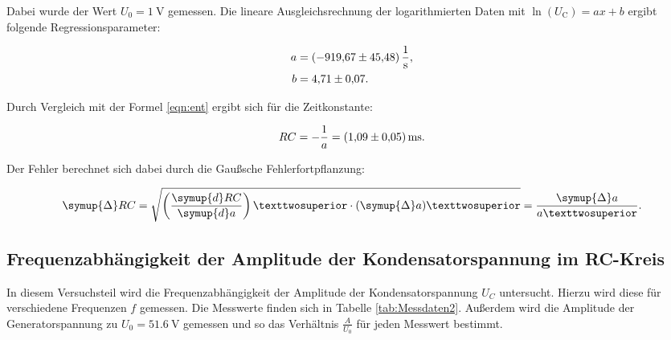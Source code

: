 Dabei wurde der Wert $U_0 = \SI{1}{\volt}$ gemessen.
Die lineare Ausgleichsrechnung der logarithmierten Daten mit $\ln{\left(U_\text{C}\right)}=ax+b$ 
ergibt folgende Regressionsparameter: 

\begin{align*}
a &= \SI{-919.67+-45.48}{\per\second},\\
b &= \num{4.71+-0.07}.
\end{align*}

Durch Vergleich mit der Formel \eqref{eqn:ent} ergibt sich für die Zeitkonstante:

\begin{equation*}
RC = -\frac{1}{a} = \SI{1.09+-0.05}{\milli\second}.
\end{equation*}

Der Fehler berechnet sich dabei durch die Gaußsche Fehlerfortpflanzung:

\begin{equation*}
\symup{\Delta} RC = \sqrt{\left(\frac{\symup{d}RC}{\symup{d}a}\right)²\cdot (\symup{\Delta}a)²} = \frac{\symup{\Delta}a}{a²} .
\end{equation*}

\subsection{Frequenzabhängigkeit der Amplitude der Kondensatorspannung im RC-Kreis}

In diesem Versuchsteil wird die Frequenzabhängigkeit der Amplitude der 
Kondensatorspannung $U_C$ untersucht. Hierzu wird diese für verschiedene 
Frequenzen $f$ gemessen. Die Messwerte finden sich in Tabelle \ref{tab:Messdaten2}.
Außerdem wird die Amplitude der Generatorspannung zu $U_0=\SI{51.6}{\volt}$ gemessen und 
so das Verhältnis $\frac{A}{U_0}$ für jeden Messwert bestimmt. 

